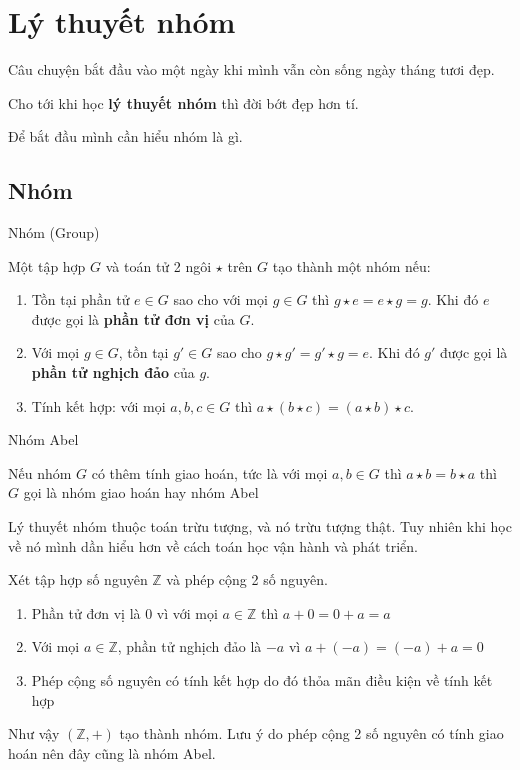 \chapter{Lý thuyết nhóm}

Câu chuyện bắt đầu vào một ngày khi mình vẫn còn sống ngày tháng tươi đẹp.

Cho tới khi học \textbf{lý thuyết nhóm} thì đời bớt đẹp hơn tí.

Để bắt đầu mình cần hiểu nhóm là gì.

\section{Nhóm}

\begin{defblock}{Nhóm (Group)}

Một tập hợp $G$ và toán tử 2 ngôi $\star$ trên $G$ tạo thành một nhóm nếu:
\begin{enumerate}[noitemsep]
    \item Tồn tại phần tử $e \in G$ sao cho với mọi $g \in G$ thì $g \star e = e \star g = g$. Khi đó $e$ được gọi là \textbf{phần tử đơn vị} của $G$.
    \item Với mọi $g \in G$, tồn tại $g' \in G$ sao cho $g \star g' = g' \star g = e$. Khi đó $g'$ được gọi là \textbf{phần tử nghịch đảo} của $g$.
    \item Tính kết hợp: với mọi $a, b, c \in G$ thì $a \star (b \star c) = (a \star b) \star c$.
\end{enumerate}
\end{defblock}

\begin{defblock}{Nhóm Abel}
    
    Nếu nhóm $G$ có thêm tính giao hoán, tức là với mọi $a, b \in G$ thì $a \star b = b \star a$ thì $G$ gọi là nhóm giao hoán hay nhóm Abel
\end{defblock}

Lý thuyết nhóm thuộc toán trừu tượng, và nó trừu tượng thật. Tuy nhiên khi học về nó mình dần hiểu hơn về cách toán học vận hành và phát triển.

\begin{example}
    Xét tập hợp số nguyên $\mathbb{Z}$ và phép cộng 2 số nguyên.
    \begin{enumerate}[noitemsep]
        \item Phần tử đơn vị là 0 vì với mọi $a \in \mathbb{Z}$ thì $a + 0 = 0 + a = a$
        \item Với mọi $a \in \mathbb{Z}$, phần tử nghịch đảo là $-a$ vì $a + (-a) = (-a) + a = 0$
        \item Phép cộng số nguyên có tính kết hợp do đó thỏa mãn điều kiện về tính kết hợp
    \end{enumerate}
    Như vậy $(\mathbb{Z}, +)$ tạo thành nhóm. Lưu ý do phép cộng 2 số nguyên có tính giao hoán nên đây cũng là nhóm Abel.
\end{example}

